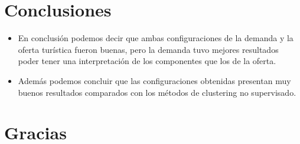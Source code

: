 \section{Conclusiones}
\begin{frame}

\begin{itemize}
    \item En conclusión  podemos decir que ambas configuraciones de la demanda y la oferta turística fueron buenas, pero la demanda tuvo mejores resultados poder tener una interpretación de los componentes que los de la oferta. 
    
    \item Además podemos concluir que las configuraciones obtenidas presentan muy buenos resultados comparados con los métodos de clustering no supervisado.
\end{itemize}
\end{frame}


\section*{Gracias \blacksmiley{}}

\printbibliography


